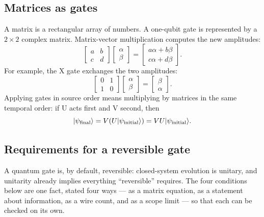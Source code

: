 \subsection{Matrices as gates}

A matrix is a rectangular array of numbers. A one-qubit gate is represented by
a $2\times2$ complex matrix. Matrix-vector multiplication computes the new
amplitudes:
\[
\begin{bmatrix}a&b\\c&d\end{bmatrix}
\begin{bmatrix}\alpha\\\beta\end{bmatrix}
=
\begin{bmatrix}a\alpha+b\beta\\c\alpha+d\beta\end{bmatrix}.
\]
For example, the X gate exchanges the two amplitudes:
\[
\begin{bmatrix}0&1\\1&0\end{bmatrix}
\begin{bmatrix}\alpha\\\beta\end{bmatrix}
=\begin{bmatrix}\beta\\\alpha\end{bmatrix}.
\]
Applying gates in source order means multiplying by matrices in the same
temporal order: if U acts first and V second, then
\[
\lvert \psi_{\rm final}\rangle=V(U\lvert \psi_{\rm initial}\rangle)=VU\lvert \psi_{\rm initial}\rangle.
\]

\subsection{Requirements for a reversible gate}
\hypertarget{gate-reversibility-requirements}{}

A quantum gate is, by default, reversible: closed-system evolution is unitary,
and unitarity already implies everything ``reversible'' requires. The four
conditions below are one fact, stated four ways --- as a matrix equation, as a
statement about information, as a wire count, and as a scope limit --- so that
each can be checked on its own.

